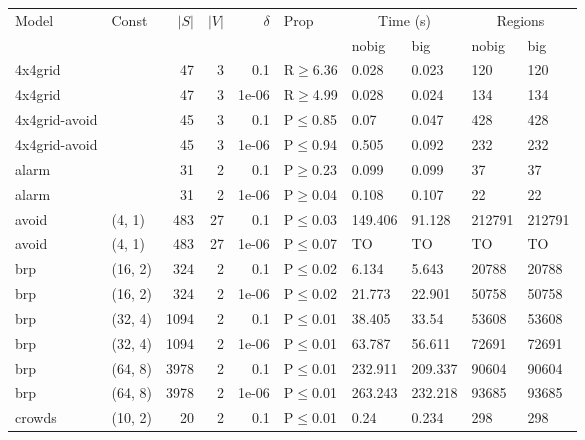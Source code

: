 \begin{longtable}{llrrrlllll}

        \toprule
        Model & Const & $|S|$ & $|V|$ & $\delta$ & Prop & \multicolumn{2}{c}{Time (s)} & \multicolumn{2}{c}{Regions} \\
        \cmidrule(ll){7-8} \cmidrule(ll){9-10}
        & & & & & & nobig & big & nobig & big \\
        \midrule
        
 4x4grid       &           &     	47 &   3 & 0.1   & R$\geq$6.36  & 0.028   & 0.023   & 120    & 120    \\
 4x4grid       &           &     	47 &   3 & 1e-06 & R$\geq$4.99  & 0.028   & 0.024   & 134    & 134    \\
 4x4grid-avoid &           &     	45 &   3 & 0.1   & P$\leq$0.85  & 0.07    & 0.047   & 428    & 428    \\
 4x4grid-avoid &           &     	45 &   3 & 1e-06 & P$\leq$0.94  & 0.505   & 0.092   & 232    & 232    \\
 alarm         &           &     	31 &   2 & 0.1   & P$\geq$0.23  & 0.099   & 0.099   & 37     & 37     \\
 alarm         &           &     	31 &   2 & 1e-06 & P$\geq$0.04  & 0.108   & 0.107   & 22     & 22     \\
 avoid         & (4, 1)    &    	483 &  27 & 0.1   & P$\leq$0.03  & 149.406 & 91.128  & 212791 & 212791 \\
 avoid         & (4, 1)    &    	483 &  27 & 1e-06 & P$\leq$0.07  & TO      & TO      & TO     & TO     \\
 brp           & (16, 2)   &    	324 &   2 & 0.1   & P$\leq$0.02  & 6.134   & 5.643   & 20788  & 20788  \\
 brp           & (16, 2)   &    	324 &   2 & 1e-06 & P$\leq$0.02  & 21.773  & 22.901  & 50758  & 50758  \\
 brp           & (32, 4)   &   	1094 &   2 & 0.1   & P$\leq$0.01  & 38.405  & 33.54   & 53608  & 53608  \\
 brp           & (32, 4)   &   	1094 &   2 & 1e-06 & P$\leq$0.01  & 63.787  & 56.611  & 72691  & 72691  \\
 brp           & (64, 8)   &   	3978 &   2 & 0.1   & P$\leq$0.01  & 232.911 & 209.337 & 90604  & 90604  \\
 brp           & (64, 8)   &   	3978 &   2 & 1e-06 & P$\leq$0.01  & 263.243 & 232.218 & 93685  & 93685  \\
 crowds        & (10, 2)   &     	20 &   2 & 0.1   & P$\leq$0.01  & 0.24    & 0.234   & 298    & 298    \\

\end{longtable}
